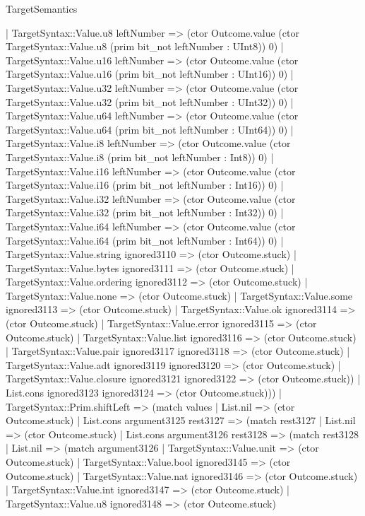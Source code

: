 \begin{lexlean}{TargetSemantics}
\begin{semanticmodule}
{          | TargetSyntax::Value.u8 leftNumber => (ctor Outcome.value (ctor TargetSyntax::Value.u8 (prim bit_not leftNumber : UInt8)) 0)
          | TargetSyntax::Value.u16 leftNumber => (ctor Outcome.value (ctor TargetSyntax::Value.u16 (prim bit_not leftNumber : UInt16)) 0)
          | TargetSyntax::Value.u32 leftNumber => (ctor Outcome.value (ctor TargetSyntax::Value.u32 (prim bit_not leftNumber : UInt32)) 0)
          | TargetSyntax::Value.u64 leftNumber => (ctor Outcome.value (ctor TargetSyntax::Value.u64 (prim bit_not leftNumber : UInt64)) 0)
          | TargetSyntax::Value.i8 leftNumber => (ctor Outcome.value (ctor TargetSyntax::Value.i8 (prim bit_not leftNumber : Int8)) 0)
          | TargetSyntax::Value.i16 leftNumber => (ctor Outcome.value (ctor TargetSyntax::Value.i16 (prim bit_not leftNumber : Int16)) 0)
          | TargetSyntax::Value.i32 leftNumber => (ctor Outcome.value (ctor TargetSyntax::Value.i32 (prim bit_not leftNumber : Int32)) 0)
          | TargetSyntax::Value.i64 leftNumber => (ctor Outcome.value (ctor TargetSyntax::Value.i64 (prim bit_not leftNumber : Int64)) 0)
          | TargetSyntax::Value.string ignored3110 => (ctor Outcome.stuck)
          | TargetSyntax::Value.bytes ignored3111 => (ctor Outcome.stuck)
          | TargetSyntax::Value.ordering ignored3112 => (ctor Outcome.stuck)
          | TargetSyntax::Value.none => (ctor Outcome.stuck)
          | TargetSyntax::Value.some ignored3113 => (ctor Outcome.stuck)
          | TargetSyntax::Value.ok ignored3114 => (ctor Outcome.stuck)
          | TargetSyntax::Value.error ignored3115 => (ctor Outcome.stuck)
          | TargetSyntax::Value.list ignored3116 => (ctor Outcome.stuck)
          | TargetSyntax::Value.pair ignored3117 ignored3118 => (ctor Outcome.stuck)
          | TargetSyntax::Value.adt ignored3119 ignored3120 => (ctor Outcome.stuck)
          | TargetSyntax::Value.closure ignored3121 ignored3122 => (ctor Outcome.stuck))
        | List.cons ignored3123 ignored3124 => (ctor Outcome.stuck)))
    | TargetSyntax::Prim.shiftLeft => (match values
      | List.nil => (ctor Outcome.stuck)
      | List.cons argument3125 rest3127 => (match rest3127
        | List.nil => (ctor Outcome.stuck)
        | List.cons argument3126 rest3128 => (match rest3128
          | List.nil => (match argument3126
            | TargetSyntax::Value.unit => (ctor Outcome.stuck)
            | TargetSyntax::Value.bool ignored3145 => (ctor Outcome.stuck)
            | TargetSyntax::Value.nat ignored3146 => (ctor Outcome.stuck)
            | TargetSyntax::Value.int ignored3147 => (ctor Outcome.stuck)
            | TargetSyntax::Value.u8 ignored3148 => (ctor Outcome.stuck)
}
\end{semanticmodule}
\end{lexlean}

